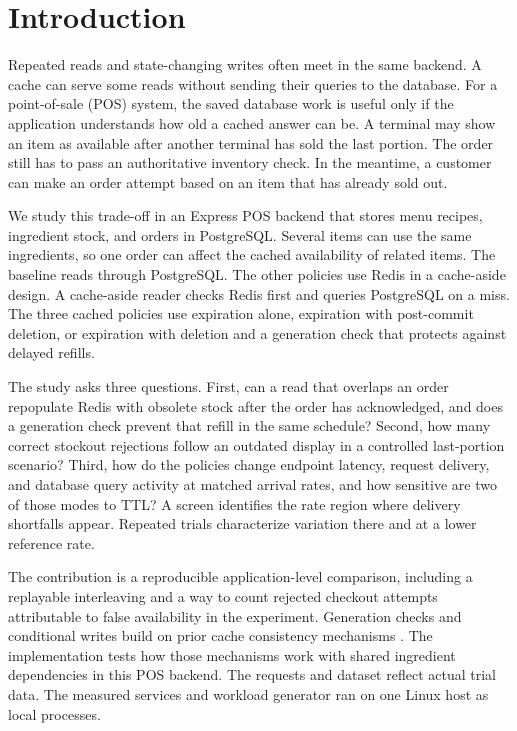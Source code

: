 \section{Introduction}

Repeated reads and state-changing writes often meet in the same backend. A cache can serve some reads without sending their queries to the database. For a point-of-sale (POS) system, the saved database work is useful only if the application understands how old a cached answer can be. A terminal may show an item as available after another terminal has sold the last portion. The order still has to pass an authoritative inventory check. In the meantime, a customer can make an order attempt based on an item that has already sold out.

We study this trade-off in an Express POS backend that stores menu recipes, ingredient stock, and orders in PostgreSQL. Several items can use the same ingredients, so one order can affect the cached availability of related items. The baseline reads through PostgreSQL. The other policies use Redis in a cache-aside design. A cache-aside reader checks Redis first and queries PostgreSQL on a miss. The three cached policies use expiration alone, expiration with post-commit deletion, or expiration with deletion and a generation check that protects against delayed refills.

The study asks three questions. First, can a read that overlaps an order repopulate Redis with obsolete stock after the order has acknowledged, and does a generation check prevent that refill in the same schedule? Second, how many correct stockout rejections follow an outdated display in a controlled last-portion scenario? Third, how do the policies change endpoint latency, request delivery, and database query activity at matched arrival rates, and how sensitive are two of those modes to TTL? A screen identifies the rate region where delivery shortfalls appear. Repeated trials characterize variation there and at a lower reference rate.

The contribution is a reproducible application-level comparison, including a replayable interleaving and a way to count rejected checkout attempts attributable to false availability in the experiment. Generation checks and conditional writes build on prior cache consistency mechanisms \cite{nishtala2013}. The implementation tests how those mechanisms work with shared ingredient dependencies in this POS backend. The requests and dataset reflect actual trial data. The measured services and workload generator ran on one Linux host as local processes.
